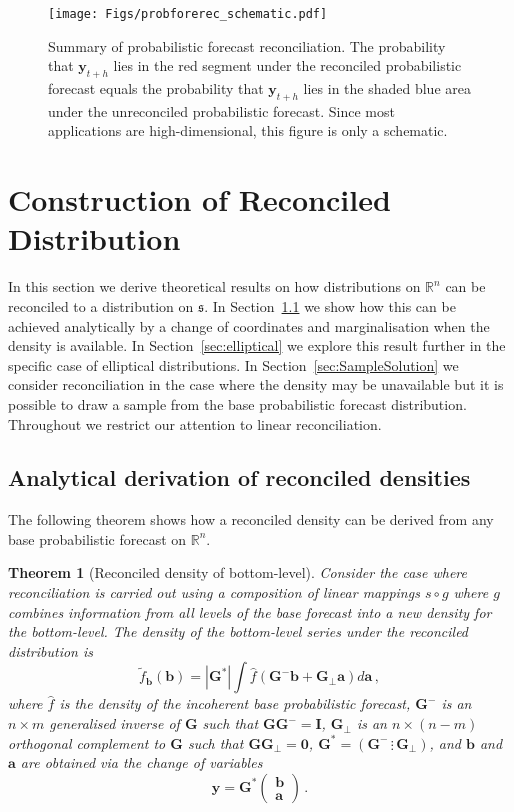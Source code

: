 \documentclass[a4paper,12pt]{article}
\newtheorem{theo}{Theorem}[section]
\theoremstyle{definition}
\begin{document}
\begin{figure}[!htb]
	\centering \texttt{[image: Figs/probforerec\_schematic.pdf]}
	\caption{Summary of probabilistic forecast reconciliation. The probability that $\bm{y}_{t+h}$ lies in the red segment under the reconciled probabilistic forecast equals the probability that $\bm{y}_{t+h}$ lies in the shaded blue area under the unreconciled probabilistic forecast. Since most applications are high-dimensional, this figure is only a schematic.}\label{fig:probfr_sch}
\end{figure}


\section{Construction of Reconciled Distribution} \label{sec:AnalyticalSolution}

In this section we derive theoretical results on how distributions on $\mathbb{R}^n$ can be reconciled to a distribution on $\mathfrak{s}$. In Section~\ref{sec:andens} we show how this can be achieved analytically by a change of coordinates and marginalisation when the density is available. In Section~\ref{sec:elliptical} we explore this result further in the specific case of elliptical distributions. In Section~\ref{sec:SampleSolution} we consider reconciliation in the case where the density may be unavailable but it is possible to draw a sample from the base probabilistic forecast distribution. Throughout we restrict our attention to linear reconciliation.


\subsection{Analytical derivation of reconciled densities}\label{sec:andens}

The following theorem shows how a reconciled density can be derived from any base probabilistic forecast on $\mathbb{R}^n$.

\begin{theo}[Reconciled density of bottom-level]\label{theo:bottomdens}
	Consider the case where reconciliation is carried out using a composition of linear mappings $s\circ g$ where $g$ combines information from all levels of the base forecast into a new density for the bottom-level. The density of the bottom-level series under the reconciled distribution is
	\[
	\tilde{f}_{\bm{b}}(\bm{b})=|\bm{G}^*|\int \hat{f}(\bm{G}^{-}\bm{b}+\bm{G}_\perp \bm{a})d\bm{a}\,,
	\]
	where $\hat{f}$ is the density of the incoherent base probabilistic forecast, $\bm{G}^-$ is an $n\times m$ generalised inverse of $\bm{G}$ such that $\bm{G}\bm{G}^-=\bm{I}$, $\bm{G}_\perp$ is an $n\times (n-m)$ orthogonal complement to $\bm{G}$ such that $\bm{G}\bm{G}_\perp=\bm{0}$, $\bm{G}^*=\left(\bm{G}^-\,\vdots\,\bm{G}_\perp\right)$, and $\bm{b}$ and $\bm{a}$ are obtained via the change of variables
	\[
	\bm{y}=\bm{G}^*\begin{pmatrix}\bm{b}\\\bm{a}\end{pmatrix}\,.
	\]
\end{theo}
\end{document}

